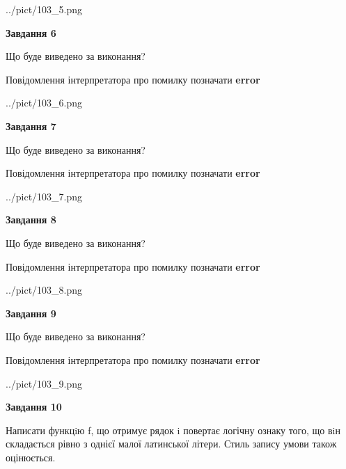 \documentclass[12pt, ukrainian]{article}
\begin{document}
{\begin {large}
\begin{center}
	{../pict/103_5.png}
\end{center}
\newpage

{\begin {center}\textbf{Завдання 6}\end {center}}\par
Що буде виведено за виконання? \par
Повідомлення інтерпретатора про помилку позначати \textbf{error}

\begin{center}
	{../pict/103_6.png}
\end{center}
\newpage

{\begin {center}\textbf{Завдання 7}\end {center}}\par
Що буде виведено за виконання? \par
Повідомлення інтерпретатора про помилку позначати \textbf{error}

\begin{center}
	{../pict/103_7.png}
\end{center}
\newpage

{\begin {center}\textbf{Завдання 8}\end {center}}\par
Що буде виведено за виконання? \par
Повідомлення інтерпретатора про помилку позначати \textbf{error}

\begin{center}
	{../pict/103_8.png}
\end{center}
\newpage

{\begin {center}\textbf{Завдання 9}\end {center}}\par
Що буде виведено за виконання? \par
Повідомлення інтерпретатора про помилку позначати \textbf{error}

\begin{center}
	{../pict/103_9.png}
\end{center}
\newpage

{\begin {center}\textbf{Завдання 10}\end {center}}\par

Написати функцiю f, що отримує рядок i повертає логічну ознаку того, що вiн складається рівно з однієї малої латинської літери. Стиль запису умови також оцінюється.\par
\newpage

\end {large}}
\end{document}
